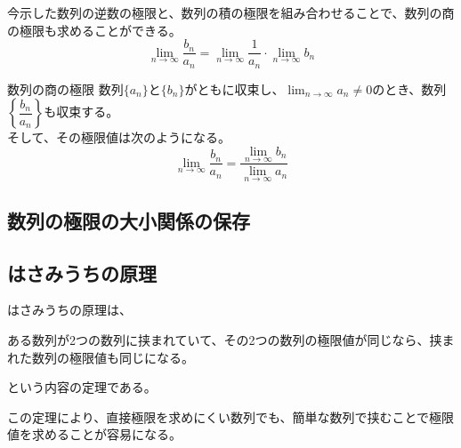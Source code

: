 \documentclass[../../imaging-math]{subfiles}
\begin{document}
今示した数列の逆数の極限と、数列の積の極限を組み合わせることで、数列の商の極限も求めることができる。
\begin{equation*}
  \lim_{n \to \infty} \dfrac{b_n}{a_n} = \lim_{n\to\infty}\dfrac{1}{a_n} \cdot \lim_{n\to\infty} b_n
\end{equation*}

\begin{theorem}{数列の商の極限}
  \titlegap
  数列$\{a_n\}$と$\{b_n\}$がともに収束し、$\displaystyle\lim_{n \to \infty} a_n \neq 0$のとき、数列$\left\{\dfrac{b_n}{a_n}\right\}$も収束する。\\
  そして、その極限値は次のようになる。
  \LARGE
  \begin{equation}
    \lim_{n \to \infty} \dfrac{b_n}{a_n} = \dfrac{\displaystyle\lim_{n \to \infty} b_n}{\displaystyle\lim_{n \to \infty} a_n}
  \end{equation}
\end{theorem}

\subsection{数列の極限の大小関係の保存}


\subsection{はさみうちの原理}

はさみうちの原理は、

\begin{emphabox}
  ある数列が2つの数列に挟まれていて、その2つの数列の極限値が同じなら、挟まれた数列の極限値も同じになる。
\end{emphabox}

という内容の定理である。

この定理により、直接極限を求めにくい数列でも、簡単な数列で挟むことで極限値を求めることが容易になる。
\end{document}
